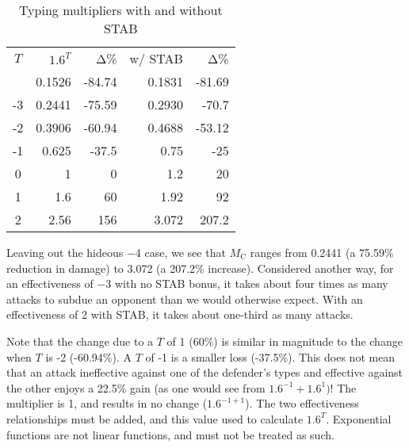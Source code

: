 \begin{table}
\begin{center}
\begin{tabular}{c r r r r}
  $T$ & $1.6^{T}$ & Δ\% & w/ STAB & Δ\% \\
\Midrule
  -4 & 0.1526 & -84.74 & 0.1831 & -81.69 \\
  -3 & 0.2441 & -75.59 & 0.2930 & -70.7 \\
  -2 & 0.3906 & -60.94 & 0.4688 & -53.12 \\
  -1 & 0.625 & -37.5 & 0.75 & -25 \\
  0 & 1 & 0 & 1.2 & 20 \\
  1 & 1.6 & 60 & 1.92 & 92 \\
  2 & 2.56 & 156 & 3.072 & 207.2 \\
\end{tabular}
  \caption{Typing multipliers with and without STAB\label{table:typemult}}
\end{center}
\end{table}

Leaving out the hideous −4 case, we see that $M_\mathrm{C}$ ranges
 from 0.2441 (a 75.59\% reduction in damage) to 3.072
 (a 207.2\% increase).
Considered another way, for an effectiveness of −3 with no STAB bonus,
 it takes about four times as many attacks to subdue an opponent than
 we would otherwise expect.
With an effectiveness of 2 with STAB, it takes about one-third as many attacks.

Note that the change due to a $T$ of 1 (60\%) is similar in magnitude to the change
 when $T$ is -2 (-60.94\%). A $T$ of -1 is a smaller loss (\hbox{-37.5\%}).
This does not mean that an attack ineffective against one of the defender's types and
 effective against the other enjoys a 22.5\% gain (as one would see from $1.6^{-1} + 1.6^{1})$!
The multiplier is 1, and results in no change ($1.6^{-1+1}$).
The two effectiveness relationships must be added, and this value used to
 calculate $1.6^T$.
Exponential functions are not linear functions, and must not be treated as such.

